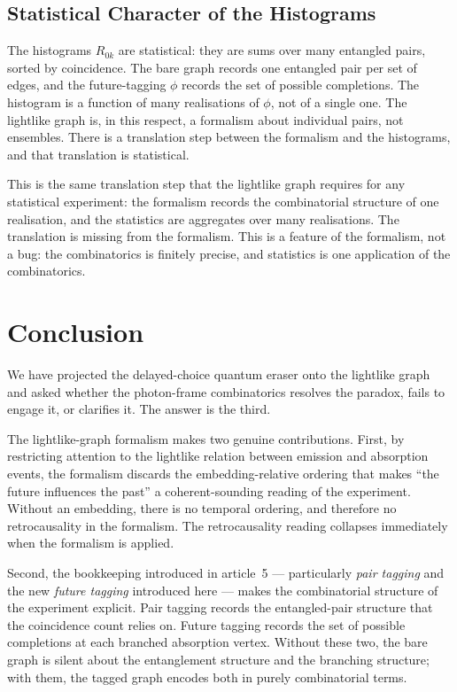 \documentclass[11pt]{article}
\begin{document}
\subsection{Statistical Character of the Histograms}

The histograms $R_{0k}$ are statistical: they are sums over many entangled pairs, sorted by coincidence. The bare graph records one entangled pair per set of edges, and the future-tagging $\phi$ records the set of possible completions. The histogram is a function of many realisations of $\phi$, not of a single one. The lightlike graph is, in this respect, a formalism about individual pairs, not ensembles. There is a translation step between the formalism and the histograms, and that translation is statistical.

This is the same translation step that the lightlike graph requires for any statistical experiment: the formalism records the combinatorial structure of one realisation, and the statistics are aggregates over many realisations. The translation is missing from the formalism. This is a feature of the formalism, not a bug: the combinatorics is finitely precise, and statistics is one application of the combinatorics.

\section{Conclusion}
\label{sec:conclusion}

We have projected the delayed-choice quantum eraser onto the lightlike graph and asked whether the photon-frame combinatorics resolves the paradox, fails to engage it, or clarifies it. The answer is the third.

The lightlike-graph formalism makes two genuine contributions. First, by restricting attention to the lightlike relation between emission and absorption events, the formalism discards the embedding-relative ordering that makes ``the future influences the past'' a coherent-sounding reading of the experiment. Without an embedding, there is no temporal ordering, and therefore no retrocausality in the formalism. The retrocausality reading collapses immediately when the formalism is applied.

Second, the bookkeeping introduced in article~5 --- particularly \emph{pair tagging} and the new \emph{future tagging} introduced here --- makes the combinatorial structure of the experiment explicit. Pair tagging records the entangled-pair structure that the coincidence count relies on. Future tagging records the set of possible completions at each branched absorption vertex. Without these two, the bare graph is silent about the entanglement structure and the branching structure; with them, the tagged graph encodes both in purely combinatorial terms.
\end{document}
